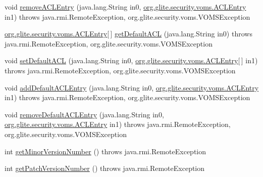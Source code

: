 \begin{DoxyCompactItemize}
\item 
void \hyperlink{classorg_1_1glite_1_1security_1_1voms_1_1service_1_1admin_1_1VOMSAdminSoapBindingImpl_a1b635d8816ceebc6c58aa3a6368522e7}{removeACLEntry} (java.lang.String in0, \hyperlink{classorg_1_1glite_1_1security_1_1voms_1_1ACLEntry}{org.glite.security.voms.ACLEntry} in1)  throws java.rmi.RemoteException, org.glite.security.voms.VOMSException 
\item 
\hyperlink{classorg_1_1glite_1_1security_1_1voms_1_1ACLEntry}{org.glite.security.voms.ACLEntry}\mbox{[}$\,$\mbox{]} \hyperlink{classorg_1_1glite_1_1security_1_1voms_1_1service_1_1admin_1_1VOMSAdminSoapBindingImpl_af0ba448479f1151cbd74053f4e136fa4}{getDefaultACL} (java.lang.String in0)  throws java.rmi.RemoteException, org.glite.security.voms.VOMSException 
\item 
void \hyperlink{classorg_1_1glite_1_1security_1_1voms_1_1service_1_1admin_1_1VOMSAdminSoapBindingImpl_a8dbeefded95cd2bfef792606267e66e9}{setDefaultACL} (java.lang.String in0, \hyperlink{classorg_1_1glite_1_1security_1_1voms_1_1ACLEntry}{org.glite.security.voms.ACLEntry}\mbox{[}$\,$\mbox{]} in1)  throws java.rmi.RemoteException, org.glite.security.voms.VOMSException 
\item 
void \hyperlink{classorg_1_1glite_1_1security_1_1voms_1_1service_1_1admin_1_1VOMSAdminSoapBindingImpl_a477b3c63b0984c95ef37ca0e3f9f2602}{addDefaultACLEntry} (java.lang.String in0, \hyperlink{classorg_1_1glite_1_1security_1_1voms_1_1ACLEntry}{org.glite.security.voms.ACLEntry} in1)  throws java.rmi.RemoteException, org.glite.security.voms.VOMSException 
\item 
void \hyperlink{classorg_1_1glite_1_1security_1_1voms_1_1service_1_1admin_1_1VOMSAdminSoapBindingImpl_acd957ed9a1e586f76b04236298d3c511}{removeDefaultACLEntry} (java.lang.String in0, \hyperlink{classorg_1_1glite_1_1security_1_1voms_1_1ACLEntry}{org.glite.security.voms.ACLEntry} in1)  throws java.rmi.RemoteException, org.glite.security.voms.VOMSException 
\item 
int \hyperlink{classorg_1_1glite_1_1security_1_1voms_1_1service_1_1admin_1_1VOMSAdminSoapBindingImpl_a02a972bc003ac394e0929bcfed81ee18}{getMinorVersionNumber} ()  throws java.rmi.RemoteException 
\item 
int \hyperlink{classorg_1_1glite_1_1security_1_1voms_1_1service_1_1admin_1_1VOMSAdminSoapBindingImpl_adf080b45daf7070c290549828cb80835}{getPatchVersionNumber} ()  throws java.rmi.RemoteException 
\end{DoxyCompactItemize}


